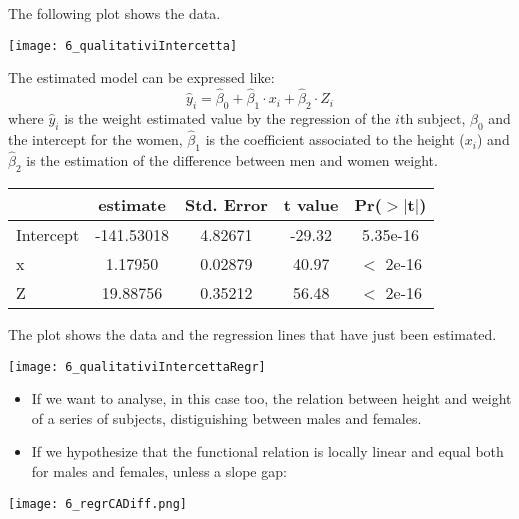 \begin{frame}
  The following plot shows the data.
  \begin{center}
    \texttt{[image: 6\_qualitativiIntercetta]}
  \end{center}
\end{frame}

\begin{frame}
  The estimated model can be expressed like: $$ \hat{y}_i = \hat{\beta}_0 + \hat{\beta}_1 \cdot x_{i} + \hat{\beta}_2 \cdot Z_{i} $$ where $ \hat{y}_i $ is the weight estimated value by the regression of the $i$th subject, $ \hat{\beta}_0 $ and the intercept for the women, $ \hat{\beta}_1 $ is the coefficient associated to the height ($ x_{i} $) and $ \hat{\beta}_2 $ is the estimation of the difference between men and women weight.\\
  \vspace{1cm}
  \begin{center}
    \begin{tabular}{|l|c|c|c|c|}
      \hline
                 &       estimate & Std. Error & t value & Pr($>|$t$|$)\\ 
      \hline
      Intercept & -141.53018 &    4.82671 &  -29.32 &   5.35e-16  \\
      \hline
      x          &    1.17950 &    0.02879 &   40.97 &   $<$ 2e-16   \\
      \hline
      Z          &   19.88756 &    0.35212 &   56.48 &   $<$ 2e-16   \\
      \hline
    \end{tabular}
  \end{center}
\end{frame}

\begin{frame}[fragile]
  The plot shows the data and the regression lines that have just been estimated.
  \begin{center}
    \texttt{[image: 6\_qualitativiIntercettaRegr]}
  \end{center}
\end{frame}


\begin{frame}
  \begin{itemize}
    \item If we want to analyse, in this case too, the relation between height and weight of a series of subjects, distiguishing between males and females.
    \item If we hypothesize that the functional relation is locally linear and equal both for males and females, unless a slope gap:
  \end{itemize}
  \begin{center}
    \texttt{[image: 6\_regrCADiff.png]}
  \end{center}
\end{frame}

